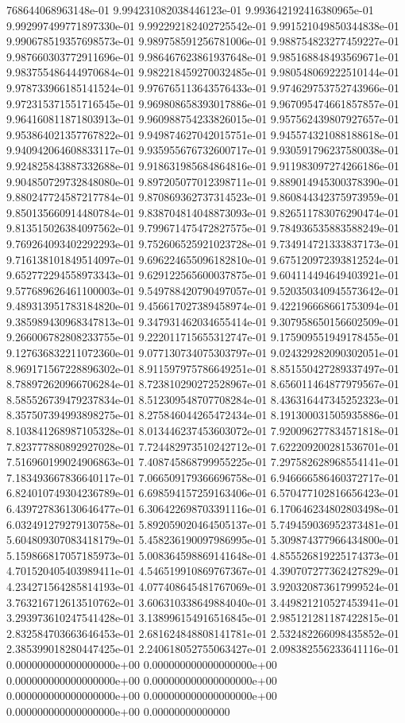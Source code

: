 768644068963148e-01	9.994231082038446123e-01	9.993642192416380965e-01	9.992997499771897330e-01	9.992292182402725542e-01	9.991521049850344838e-01	9.990678519357698573e-01	9.989758591256781006e-01	9.988754823277459227e-01	9.987660303772911696e-01	9.986467623861937648e-01	9.985168848493569671e-01	9.983755486444970684e-01	9.982218459270032485e-01	9.980548069222510144e-01	9.978733966185141524e-01	9.976765113643576433e-01	9.974629753752743966e-01	9.972315371551716545e-01	9.969808658393017886e-01	9.967095474661857857e-01	9.964160811871803913e-01	9.960988754233826015e-01	9.957562439807927657e-01	9.953864021357767822e-01	9.949874627042015751e-01	9.945574321088188618e-01	9.940942064608833117e-01	9.935955676732600717e-01	9.930591796237580038e-01	9.924825843887332688e-01	9.918631985684864816e-01	9.911983097274266186e-01	9.904850729732848080e-01	9.897205077012398711e-01	9.889014945300378390e-01	9.880247724587217784e-01	9.870869362737314523e-01	9.860844342375973959e-01	9.850135660914480784e-01	9.838704814048873093e-01	9.826511783076290474e-01	9.813515026384097562e-01	9.799671475472827575e-01	9.784936535883588249e-01	9.769264093402292293e-01	9.752606525921023728e-01	9.734914721333837173e-01	9.716138101849514097e-01	9.696224655096182810e-01	9.675120972393812524e-01	9.652772294558973343e-01	9.629122565600037875e-01	9.604114494649403921e-01	9.577689626461100003e-01	9.549788420790497057e-01	9.520350340945573642e-01	9.489313951783184820e-01	9.456617027389458974e-01	9.422196668661753094e-01	9.385989430968347813e-01	9.347931462034655414e-01	9.307958650156602509e-01	9.266006782808233755e-01	9.222011715655312747e-01	9.175909551949178455e-01	9.127636832211072360e-01	9.077130734075303797e-01	9.024329282090302051e-01	8.969171567228896302e-01	8.911597975786649251e-01	8.851550427289337497e-01	8.788972620966706284e-01	8.723810290272528967e-01	8.656011464877979567e-01	8.585526739479237834e-01	8.512309548707708284e-01	8.436316447345252323e-01	8.357507394993898275e-01	8.275846044265472434e-01	8.191300031505935886e-01	8.103841268987105328e-01	8.013446237453603072e-01	7.920096277834571818e-01	7.823777880892927028e-01	7.724482973510242712e-01	7.622209200281536701e-01	7.516960199024906863e-01	7.408745868799955225e-01	7.297582628968554141e-01	7.183493667836640117e-01	7.066509179366696758e-01	6.946666586460372717e-01	6.824010749304236789e-01	6.698594157259163406e-01	6.570477102816656423e-01	6.439727836130646477e-01	6.306422698703391116e-01	6.170646234802803498e-01	6.032491279279130758e-01	5.892059020464505137e-01	5.749459036952373481e-01	5.604809307083418179e-01	5.458236190097986995e-01	5.309874377966434800e-01	5.159866817057185973e-01	5.008364598869141648e-01	4.855526819225174373e-01	4.701520405403989411e-01	4.546519910869767367e-01	4.390707277362427829e-01	4.234271564285814193e-01	4.077408645481767069e-01	3.920320873617999524e-01	3.763216712613510762e-01	3.606310338649884040e-01	3.449821210527453941e-01	3.293973610247541428e-01	3.138996154916516845e-01	2.985121281187422815e-01	2.832584703663646453e-01	2.681624848808141781e-01	2.532482266098435852e-01	2.385399018280447425e-01	2.240618052755063427e-01	2.098382556233641116e-01	0.000000000000000000e+00	0.000000000000000000e+00	0.000000000000000000e+00	0.000000000000000000e+00	0.000000000000000000e+00	0.000000000000000000e+00	0.000000000000000000e+00	0.00000000000000